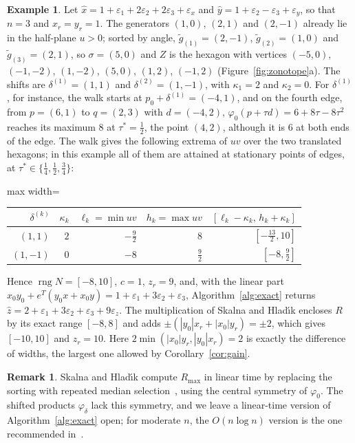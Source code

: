 \documentclass[10pt]{article}
\theoremstyle{definition}
\newtheorem{example}{Example}
\newtheorem{remark}{Remark}
\newcommand{\eps}{\varepsilon}
\newcommand{\ex}{\eps_x}
\newcommand{\ey}{\eps_y}
\newcommand{\rng}{\operatorname{rng}}
\begin{document}
\begin{example}
\label{ex:alg}
Let $\hat x=1+\eps_1+2\eps_2+2\eps_3+\ex$ and $\hat y=1+\eps_2-\eps_3+\ey$, so that $n=3$ and $x_r=y_r=1$. The generators $(1,0)$, $(2,1)$ and $(2,-1)$ already lie in the half-plane $u>0$; sorted by angle, $\tilde g_{(1)}=(2,-1)$, $\tilde g_{(2)}=(1,0)$ and $\tilde g_{(3)}=(2,1)$, so $\sigma=(5,0)$ and $Z$ is the hexagon with vertices $(-5,0)$, $(-1,-2)$, $(1,-2)$, $(5,0)$, $(1,2)$, $(-1,2)$ (Figure~\ref{fig:zonotope}a). The shifts are $\delta^{(1)}=(1,1)$ and $\delta^{(2)}=(1,-1)$, with $\kappa_1=2$ and $\kappa_2=0$. For $\delta^{(1)}$, for instance, the walk starts at $p_0+\delta^{(1)}=(-4,1)$, and on the fourth edge, from $p=(6,1)$ to $q=(2,3)$ with $d=(-4,2)$, $\varphi_0(p+\tau d)=6+8\tau-8\tau^2$ reaches its maximum $8$ at $\tau^*=\tfrac12$, the point $(4,2)$, although it is $6$ at both ends of the edge. The walk gives the following extrema of $uv$ over the two translated hexagons; in this example all of them are attained at stationary points of edges, at $\tau^*\in\{\tfrac14,\tfrac12,\tfrac34\}$:
\begin{center}
\small
\begin{adjustbox}{max width=\linewidth}\begin{tabular}{rrrrr}
\toprule
$\delta^{(k)}$ & $\kappa_k$ & $\ell_k=\min uv$ & $h_k=\max uv$ & $[\ell_k-\kappa_k,\,h_k+\kappa_k]$ \\
\midrule
$(1,1)$ & $2$ & $-\tfrac92$ & $8$ & $[-\tfrac{13}2,10]$ \\
$(1,-1)$ & $0$ & $-8$ & $\tfrac92$ & $[-8,\tfrac92]$ \\
\bottomrule
\end{tabular}\end{adjustbox}
\end{center}
Hence $\rng N=[-8,10]$, $c=1$, $z_r=9$, and, with the linear part $x_0y_0+e^T(y_0x+x_0y)=1+\eps_1+3\eps_2+\eps_3$, Algorithm~\ref{alg:exact} returns $\hat z=2+\eps_1+3\eps_2+\eps_3+9\eps_z$. The multiplication of Skalna and Hlad\'{\i}k encloses $R$ by its exact range $[-8,8]$ and adds $\pm(|y_0|x_r+|x_0|y_r)=\pm2$, which gives $[-10,10]$ and $z_r=10$. Here $2\min(|x_0|y_r,|y_0|x_r)=2$ is exactly the difference of widths, the largest one allowed by Corollary~\ref{cor:gain}.
\end{example}

\begin{remark}
Skalna and Hlad\'{\i}k compute $R_{\max}$ in linear time by replacing the sorting with repeated median selection~\cite[Prop.~8]{skalna2017new}, using the central symmetry of $\varphi_0$. The shifted products $\varphi_\delta$ lack this symmetry, and we leave a linear-time version of Algorithm~\ref{alg:exact} open; for moderate $n$, the $O(n\log n)$ version is the one recommended in~\cite{skalna2017new}.
\end{remark}
\end{document}
